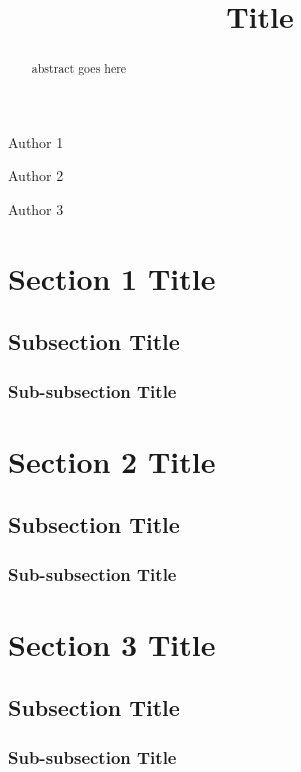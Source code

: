 \documentclass[12 pt]{article}        	%
\title{Title}
\begin{document}
\maketitle
\begin{center}

    Author 1

    Author 2

    Author 3
\end{center}

\begin{abstract}
    abstract goes here
\end{abstract}


\vspace{11in}
\tableofcontents
\vspace{11in}


\section{Section 1 Title}
\subsection{Subsection Title}
\subsubsection{Sub-subsection Title}

\section{Section 2 Title}
\subsection{Subsection Title}
\subsubsection{Sub-subsection Title}

\section{Section 3 Title}
\subsection{Subsection Title}
\subsubsection{Sub-subsection Title}
\end{document}
